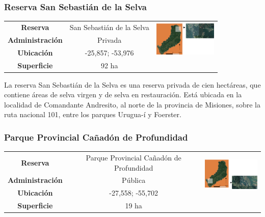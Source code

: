 \subsubsection{Reserva San Sebastián de la Selva}
\begin{table}[H]
\centering
\begin{tabular}{|c|c|c|}
\hline
 \textbf{Reserva} & San Sebastián de la Selva &   \multirow{ 3}{*}{\includegraphics[width=30mm]{Imagenes/San Sebastian.png}}\\ 
\textbf{Administración} & Privada\\
        
        \textbf{Ubicación} & -25,857; -53,976 \\
         
        \textbf{Superficie} & 92 ha\\
\hline        
\end{tabular}

\label{San Sebastian}
\end{table}

La reserva San Sebastián de la Selva es una reserva privada de cien hectáreas, que contiene áreas de selva virgen y de selva en restauración. Está ubicada en la localidad de Comandante Andresito, al norte de la provincia de Misiones, sobre la ruta nacional 101, entre los parques Urugua-í y Foerster. 
\subsubsection{Parque Provincial Cañadón de Profundidad}
\begin{table}[H]
\centering
\begin{tabular}{|c|c|c|}
\hline
 \textbf{Reserva} & Parque Provincial Cañadón de Profundidad &   \multirow{ 3}{*}{\includegraphics[width=30mm]{Imagenes/Profundidad.png}}\\ 
\textbf{Administración} & Pública\\
        
        \textbf{Ubicación} & -27,558; -55,702 \\
         
        \textbf{Superficie} & 19 ha\\
\hline        
\end{tabular}

\label{Profundidad}
\end{table}
